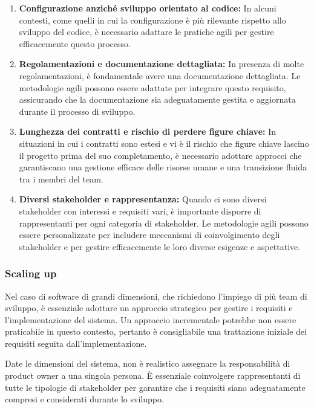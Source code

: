 \begin{enumerate}
    \item \textbf{Configurazione anziché sviluppo orientato al codice:} In alcuni contesti,
    come quelli in cui la configurazione è più rilevante rispetto allo sviluppo del codice,
    è necessario adattare le pratiche agili per gestire efficacemente questo processo.
    
    \item \textbf{Regolamentazioni e documentazione dettagliata:} In presenza di molte
    regolamentazioni, è fondamentale avere una documentazione dettagliata. Le metodologie
    agili possono essere adattate per integrare questo requisito, assicurando che la
    documentazione sia adeguatamente gestita e aggiornata durante il processo di sviluppo.
    
    \item \textbf{Lunghezza dei contratti e rischio di perdere figure chiave:} In situazioni
    in cui i contratti sono estesi e vi è il rischio che figure chiave lascino il progetto
    prima del suo completamento, è necessario adottare approcci che garantiscano una gestione
    efficace delle risorse umane e una transizione fluida tra i membri del team.
    
    \item \textbf{Diversi stakeholder e rappresentanza:} Quando ci sono diversi stakeholder
    con interessi e requisiti vari, è importante disporre di rappresentanti per ogni categoria
    di stakeholder. Le metodologie agili possono essere personalizzate per includere meccanismi
    di coinvolgimento degli stakeholder e per gestire efficacemente le loro diverse esigenze e
    aspettative.
\end{enumerate}
\subsubsection{Scaling up}

Nel caso di software di grandi dimensioni, che richiedono l'impiego di più team di
sviluppo, è essenziale adottare un approccio strategico per gestire i requisiti e
l'implementazione del sistema. Un approccio incrementale potrebbe non essere
praticabile in questo contesto, pertanto è consigliabile una trattazione iniziale
dei requisiti seguita dall'implementazione.

Date le dimensioni del sistema, non è realistico assegnare la responsabilità di
product owner a una singola persona. È essenziale coinvolgere rappresentanti di
tutte le tipologie di stakeholder per garantire che i requisiti siano adeguatamente
compresi e considerati durante lo sviluppo.

